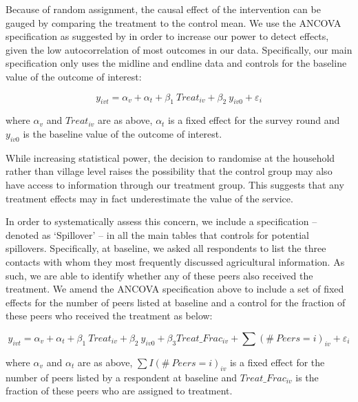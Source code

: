 \documentclass[12pt]{article}
\begin{document}
{\normalsize Because of random assignment, the causal effect of the
intervention can be gauged by comparing the treatment to the control mean. We use the ANCOVA specification as suggested by \citet{mckenzie2012beyond} in order to increase our power to detect effects, given the low autocorrelation of most outcomes in our data. Specifically, our main specification only uses the midline and endline data and controls for the baseline value of the outcome of interest:  

{\normalsize 
\begin{equation}
y_{ivt}=\alpha_{v} + \alpha_{t} +\beta_{1}\ Treat_{iv}+ \beta_{2}\ y_{iv0} + \varepsilon_{i}  \label{sd2}
\end{equation}
}

{\normalsize where $\alpha_{v}$ and $Treat_{iv}$ are as above, $\alpha_{t}$ is a fixed effect for the survey round and $ y_{iv0} $ is the baseline value of the outcome of interest.}

{\normalsize While increasing statistical power, the decision
to randomise at the household rather than village level raises the
possibility that the control group may also have access to information
through our treatment group. This suggests that any treatment effects may in
fact underestimate the value of the service.}


{\normalsize
In order to systematically assess this concern, we include a specification -- denoted as `Spillover' --  in all the main tables that controls for potential spillovers. Specifically, at baseline, we asked all respondents to list the three contacts with whom
they most frequently discussed agricultural information. As such, we are able to identify whether any of these peers also received the treatment. We amend the ANCOVA specification above to include a set of fixed effects for the number of peers listed at baseline and a control for the fraction of these peers who received the treatment as below: }  


{\normalsize 
\begin{equation}
y_{ivt}=\alpha_{v} + \alpha_{t} +\beta_{1}\ Treat_{iv}+ \beta_{2}\ y_{iv0} + \beta_{3} Treat\_Frac_{iv} + \sum(\#\ Peers = i)_{iv} + \varepsilon_{i}  \label{sd3}
\end{equation}}


{\normalsize where $\alpha_{v}$ and $\alpha_{t}$ are as above, $\sum I(\#\ Peers
= i)_{iv}$ is a fixed effect for the number of peers listed by a respondent at baseline and $Treat\_Frac_{iv}$ is the fraction of these peers who are assigned to
treatment.}

}
\end{document}
